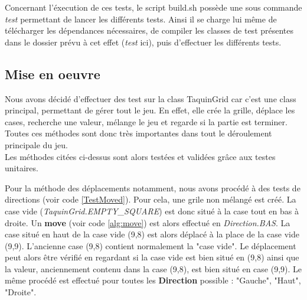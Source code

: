 			Concernant l'éxecution de ces tests, le script build.sh possède une sous commande \textit{test} permettant de lancer les différents tests. Ainsi il se charge lui même de télécharger les dépendances nécessaires, de compiler les classes de test présentes dans le dossier prévu à cet effet (\textit{test} ici), puis d'effectuer les différents tests.

		\subsection{Mise en oeuvre}
			Nous avons décidé d'effectuer des test sur la class TaquinGrid car c'est une class principal, permettant de gérer tout le jeu. En effet, elle crée la grille, déplace les cases, recherche une valeur, mélange le jeu et regarde si la partie est terminer. Toutes ces méthodes sont donc très importantes dans tout le déroulement principale du jeu.\\
			Les méthodes citées ci-dessus sont alors testées et validées grâce aux testes unitaires.

			Pour la méthode des déplacements notamment, nous avons procédé à des tests de directions (voir code \ref{TestMoved}). Pour cela, une grile non mélangé est créé. La case vide (\textit{TaquinGrid.EMPTY\_SQUARE}) est donc situé à la case tout en bas à droite. Un \textbf{move} (voir code \ref{alg:move}) est alors effectué en \textit{Direction.BAS}. La case situé en haut de la case vide (9,8) est alors déplacé à la place de la case vide (9,9). L'ancienne case (9,8) contient normalement la "case vide". Le déplacement peut alors être vérifié en regardant si la case vide est bien situé en (9,8) ainsi que la valeur, anciennement contenu dans la case (9,8), est bien situé en case (9,9). Le même procédé est effectué pour toutes les \textbf{Direction} possible : "Gauche", "Haut", "Droite".

